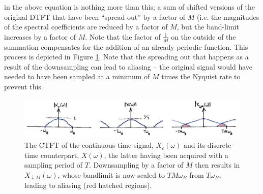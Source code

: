 in the above equation is nothing more than this; a sum of shifted versions of the original
DTFT that have been ``spread out'' by a factor of $M$ (i.e. the magnitudes of the spectral
coefficients are reduced by a factor of $M$, but the band-limit increases by a factor of
$M$. Note that the factor of $\frac{1}{M}$ on the outside of the summation compensates
for the addition of an already periodic function. This process is depicted in Figure
\ref{fig::lecture_14_downsample_alias}.
Note that the spreading out that happens as a result of the downsampling can lead to
aliasing -- the original signal would have needed to have been sampled at a minimum of $M$
times the Nyquist rate to prevent this.
%
\begin{figure}[!htb]
  \includegraphics[width=\textwidth]{images/lecture_14_downsample_alias.JPG}
  \caption{The CTFT of the continuous-time signal, $X_c(\omega)$ and its
    discrete-time counterpart, $X(\omega)$, the latter having been acquired
    with a sampling period of $T$. Downsampling by a factor of $M$ then results
    in $X_{\downarrow M}(\omega)$, whose bandlimit is now scaled to $TM\omega_B$
    from $T\omega_B$, leading to aliasing (red hatched regions).
  }
  \label{fig::lecture_14_downsample_alias}
\end{figure}
%
